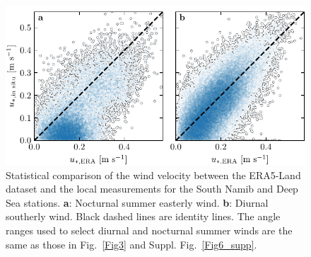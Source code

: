 \begin{figure}[p]
\centering
\includegraphics[scale=1]{Figures/Figure8_supp.pdf}
\caption{Statistical comparison of the wind velocity between the ERA5-Land dataset and the local measurements for the South Namib and Deep Sea stations. \textbf{a}: Nocturnal summer easterly wind. \textbf{b}: Diurnal southerly wind. Black dashed lines are identity lines. The angle ranges used to select diurnal and nocturnal summer winds are the same as those in Fig.~\ref{Fig3} and Suppl. Fig.~\ref{Fig6_supp}.}
\label{Fig8_supp}
\end{figure}

